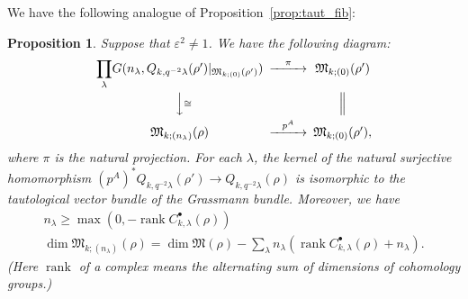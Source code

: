 \documentclass[12pt]{amsart}
\def\frak{\mathfrak}
\newcommand{\rom}{\textup}
\newtheorem{Proposition}[equation]{Proposition}
\theoremstyle{definition}
\theoremstyle{remark}
\numberwithin{equation}{subsection}
\newcommand{\propref}[1]{Proposition~\ref{#1}}
\newcommand{\rank}{\operatorname{rank}}
\newcommand{\M}{{\frak M}} %
\begin{document}
We have the following analogue of \propref{prop:taut_fib}:
%
\begin{Proposition}\label{prop:taut_fib_fix}
Suppose that $\varepsilon^2 \neq 1$.
We have the following diagram:
\begin{equation*}
\begin{CD}
   {\displaystyle \prod_\lambda}
     G(n_\lambda,Q_{k,q^{-2}\lambda}(\rho')|_{\M_{k;(0)}(\rho')})
      @>\pi>> \M_{k;(0)}(\rho') \\
   @VV{\cong}V @| \\
   \M_{k;(n_\lambda)}(\rho) @>p^A>> \M_{k;(0)}(\rho'),
\end{CD}
\end{equation*}
where $\pi$ is the natural projection.
%
For each $\lambda$, the kernel of the natural surjective homomorphism
\(
   (p^A)^* Q_{k,q^{-2}\lambda}(\rho') \to Q_{k,q^{-2}\lambda}(\rho)
\)
is isomorphic to the tautological vector bundle of the Grassmann
bundle. Moreover, we have
\begin{gather}
   n_\lambda \ge \max\left(0, -\rank
      C_{k,\lambda}^\bullet(\rho)\right) \label{eq:n_l_ineq}
\\
   \dim \M_{k;(n_\lambda)}(\rho)
   = \dim \M(\rho) - \sum_\lambda
        n_\lambda\left(\rank C_{k,\lambda}^\bullet(\rho) + n_\lambda\right).
    \label{eq:codim_locus}
\end{gather}
\rom(Here $\rank$ of a complex means the alternating sum of dimensions
of cohomology groups.\rom)
\end{Proposition}
\end{document}
